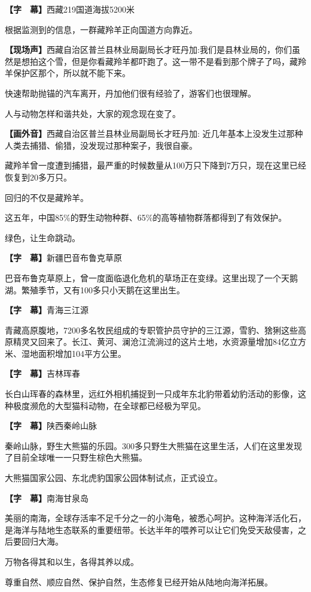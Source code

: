 \documentclass{ctexart}
\newcommand{\zkh}[1]{\textbf{\hspace{-2.7em} 【#1】}}
\begin{document}
 \zkh{字　幕}西藏219国道海拔5200米

 根据监测到的信息，一群藏羚羊正向国道方向靠近。

 \zkh{现场声}西藏自治区普兰县林业局副局长才旺丹加:我们是县林业局的，你们虽然是想拍这个雪，但是你看藏羚羊都吓跑了。这一带不是看到那个牌子了吗，藏羚羊保护区那个，所以就不能下来。

 快速帮助抛锚的汽车离开，丹加他们很有经验了，游客们也很理解。

 人与动物怎样和谐共处，大家的观念现在变了。

 \zkh{画外音}西藏自治区普兰县林业局副局长才旺丹加: 近几年基本上没发生过那种人类去捕猎、偷猎，没发现过那种案子，我很自豪。

 
藏羚羊曾一度遭到捕猎，最严重的时候数量从100万只下降到7万只，现在这里已经恢复到20多万只。

 回归的不仅是藏羚羊。

 这五年，中国85{\%}的野生动物种群、65{\%}的高等植物群落都得到了有效保护。

 绿色，让生命跳动。

 \zkh{字　幕}新疆巴音布鲁克草原

 
巴音布鲁克草原上，曾一度面临退化危机的草场正在变绿。这里出现了一个天鹅湖。繁殖季节，又有100多只小天鹅在这里出生。

 \zkh{字　幕}青海三江源

 
青藏高原腹地，7200多名牧民组成的专职管护员守护的三江源，雪豹、猞猁这些高原精灵又回来了。长江、黄河、澜沧江流淌过的这片土地，水资源量增加84亿立方米、湿地面积增加104平方公里。

 \zkh{字　幕}吉林珲春

 
长白山珲春的森林里，远红外相机捕捉到一只成年东北豹带着幼豹活动的影像，这种极度濒危的大型猫科动物，在全球都已经极为罕见。

 \zkh{字　幕}陕西秦岭山脉

 
秦岭山脉，野生大熊猫的乐园。300多只野生大熊猫在这里生活，人们在这里发现了目前全球唯一一只野生棕色大熊猫。

 大熊猫国家公园、东北虎豹国家公园体制试点，正式设立。

 \zkh{字　幕}南海甘泉岛

 
美丽的南海，全球存活率不足千分之一的小海龟，被悉心呵护。这种海洋活化石，是海洋与陆地生态联系的重要纽带。长达半年的喂养可以让它们免受天敌侵害，之后要回归大海。

 万物各得其和以生，各得其养以成。

 尊重自然、顺应自然、保护自然，生态修复已经开始从陆地向海洋拓展。
\end{document}

